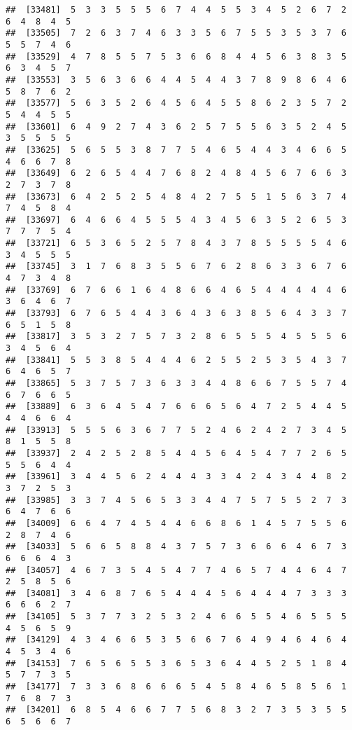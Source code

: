 \documentclass[
]{book}
\begin{document}
\begin{verbatim}
##  [33481]  5  3  3  5  5  5  6  7  4  4  5  5  3  4  5  2  6  7  2  6  4  8  4  5
##  [33505]  7  2  6  3  7  4  6  3  3  5  6  7  5  5  3  5  3  7  6  5  5  7  4  6
##  [33529]  4  7  8  5  5  7  5  3  6  6  8  4  4  5  6  3  8  3  5  6  3  4  5  7
##  [33553]  3  5  6  3  6  6  4  4  5  4  4  3  7  8  9  8  6  4  6  5  8  7  6  2
##  [33577]  5  6  3  5  2  6  4  5  6  4  5  5  8  6  2  3  5  7  2  5  4  4  5  5
##  [33601]  6  4  9  2  7  4  3  6  2  5  7  5  5  6  3  5  2  4  5  3  5  5  5  5
##  [33625]  5  6  5  5  3  8  7  7  5  4  6  5  4  4  3  4  6  6  5  4  6  6  7  8
##  [33649]  6  2  6  5  4  4  7  6  8  2  4  8  4  5  6  7  6  6  3  2  7  3  7  8
##  [33673]  6  4  2  5  2  5  4  8  4  2  7  5  5  1  5  6  3  7  4  7  4  5  8  4
##  [33697]  6  4  6  6  4  5  5  5  4  3  4  5  6  3  5  2  6  5  3  7  7  7  5  4
##  [33721]  6  5  3  6  5  2  5  7  8  4  3  7  8  5  5  5  5  4  6  3  4  5  5  5
##  [33745]  3  1  7  6  8  3  5  5  6  7  6  2  8  6  3  3  6  7  6  4  7  3  4  8
##  [33769]  6  7  6  6  1  6  4  8  6  6  4  6  5  4  4  4  4  4  6  3  6  4  6  7
##  [33793]  6  7  6  5  4  4  3  6  4  3  6  3  8  5  6  4  3  3  7  6  5  1  5  8
##  [33817]  3  5  3  2  7  5  7  3  2  8  6  5  5  5  4  5  5  5  6  3  4  5  6  4
##  [33841]  5  5  3  8  5  4  4  4  6  2  5  5  2  5  3  5  4  3  7  6  4  6  5  7
##  [33865]  5  3  7  5  7  3  6  3  3  4  4  8  6  6  7  5  5  7  4  6  7  6  6  5
##  [33889]  6  3  6  4  5  4  7  6  6  6  5  6  4  7  2  5  4  4  5  4  4  6  6  4
##  [33913]  5  5  5  6  3  6  7  7  5  2  4  6  2  4  2  7  3  4  5  8  1  5  5  8
##  [33937]  2  4  2  5  2  8  5  4  4  5  6  4  5  4  7  7  2  6  5  5  5  6  4  4
##  [33961]  3  4  4  5  6  2  4  4  4  3  3  4  2  4  3  4  4  8  2  3  7  2  5  3
##  [33985]  3  3  7  4  5  6  5  3  3  4  4  7  5  7  5  5  2  7  3  6  4  7  6  6
##  [34009]  6  6  4  7  4  5  4  4  6  6  8  6  1  4  5  7  5  5  6  2  8  7  4  6
##  [34033]  5  6  6  5  8  8  4  3  7  5  7  3  6  6  6  4  6  7  3  6  6  6  4  3
##  [34057]  4  6  7  3  5  4  5  4  7  7  4  6  5  7  4  4  6  4  7  2  5  8  5  6
##  [34081]  3  4  6  8  7  6  5  4  4  4  5  6  4  4  4  7  3  3  3  6  6  6  2  7
##  [34105]  5  3  7  7  3  2  5  3  2  4  6  6  5  5  4  6  5  5  5  4  5  6  5  9
##  [34129]  4  3  4  6  6  5  3  5  6  6  7  6  4  9  4  6  4  6  4  4  5  3  4  6
##  [34153]  7  6  5  6  5  5  3  6  5  3  6  4  4  5  2  5  1  8  4  5  7  7  3  5
##  [34177]  7  3  3  6  8  6  6  6  5  4  5  8  4  6  5  8  5  6  1  7  6  8  7  3
##  [34201]  6  8  5  4  6  6  7  7  5  6  8  3  2  7  3  5  3  5  5  6  5  6  6  7

\end{verbatim}
\end{document}
